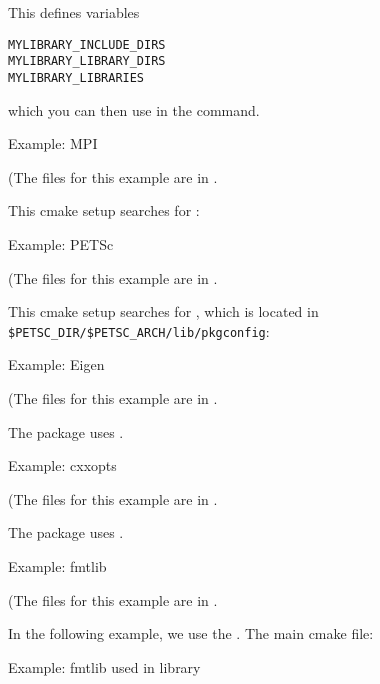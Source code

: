 This defines variables
\begin{verbatim}
MYLIBRARY_INCLUDE_DIRS
MYLIBRARY_LIBRARY_DIRS
MYLIBRARY_LIBRARIES
\end{verbatim}
which you can then use in the 
command.

 {Example: MPI}

(The files for this example are in .

This cmake setup searches for :
%



 {Example: PETSc}

(The files for this example are in .

This cmake setup searches for ,
which is located in \verb+$PETSC_DIR/$PETSC_ARCH/lib/pkgconfig+:
%



 {Example: Eigen}

(The files for this example are in .

The  package uses .




 {Example: cxxopts}

(The files for this example are in .

The  package uses .




 {Example: fmtlib}

(The files for this example are in .

In the following example, we use the .
The main cmake file:
%


 {Example: fmtlib used in library}

